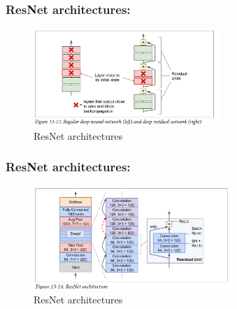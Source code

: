 \documentclass{beamer}
\begin{document}
    \begin{frame}
    \frametitle{ResNet architectures: }
         \begin{figure}[H]
            \begin{center}
                \includegraphics[width=7cm]{FIGURE13-5.png}
            \end{center}
        \caption{ResNet architectures}
        \end{figure}
    \end{frame}

    \begin{frame}
    \frametitle{ResNet architectures: }
         \begin{figure}[H]
            \begin{center}
                \includegraphics[width=7.5cm]{FIGURE13-6.png}
            \end{center}
        \caption{ResNet architectures}
        \end{figure}
    \end{frame}
    \begin{frame}
    \end{frame}
\end{document}
